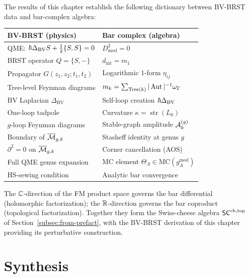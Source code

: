 \begin{remark}
The results of this chapter establish the following dictionary
between BV-BRST data and bar-complex algebra:

\medskip
\begin{center}
\renewcommand{\arraystretch}{1.3}
\begin{tabular}{l|l}
\textbf{BV-BRST (physics)} & \textbf{Bar complex (algebra)} \\
\hline
QME: $\hbar\Delta_{\mathrm{BV}}S + \frac{1}{2}\{S,S\} = 0$
 & $D_{\mathrm{mod}}^2 = 0$ \\
BRST operator $Q = \{S,-\}$
 & $d_{\mathrm{int}} = m_1$ \\
Propagator $G(z_1,z_2;t_1,t_2)$
 & Logarithmic $1$-form $\eta_{ij}$ \\
Tree-level Feynman diagrams
 & $m_k = \sum_{\mathrm{Tree}(k)} |\operatorname{Aut}|^{-1}\omega_\Gamma$ \\
BV Laplacian $\Delta_{\mathrm{BV}}$
 & Self-loop creation $\hbar\Delta_{\mathrm{BV}}$ \\
One-loop tadpole
 & Curvature $\kappa = \operatorname{str}(L_0)$ \\
$g$-loop Feynman diagrams
 & Stable-graph amplitude $\mathcal{A}_k^{(g)}$ \\
Boundary of $\overline{\mathcal{M}}_{g,k}$
 & Stasheff identity at genus $g$ \\
$\partial^2 = 0$ on $\overline{\mathcal{M}}_{g,k}$
 & Corner cancellation (AOS) \\
Full QME genus expansion
 & MC element $\Theta_A \in
 \mathrm{MC}(g^{\mathrm{mod}}_A)$ \\
HS-sewing condition
 & Analytic bar convergence
\end{tabular}
\end{center}

\medskip\noindent
The $\mathbb{C}$-direction of the FM product space governs the bar
differential (holomorphic factorization); the $\mathbb{R}$-direction
governs the bar coproduct (topological factorization). Together
they form the Swiss-cheese algebra
$\mathsf{SC}^{\mathrm{ch,top}}$ of Section~\ref{subsec:from-prefact},
with the BV-BRST derivation of this chapter providing its
perturbative construction.
\end{remark}

\section{Synthesis}
\label{sec:bvconstr-ext-supplement}


